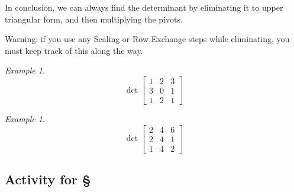 \documentclass[11pt,oneside]{amsbook}
\theoremstyle{definition}
\theoremstyle{plain}
\theoremstyle{definition}
\theoremstyle{remark}
\newtheorem{example}[theorem]{Example}
\numberwithin{equation}{section}
\numberwithin{figure}{section}
\begin{document}
In conclusion, we can always find the determinant by eliminating it to upper triangular form, and then multiplying the pivots.

Warning: if you use any Scaling or Row Exchange steps while eliminating, you must keep track of this along the way.

\begin{example}
  \[\det\begin{bmatrix}1&2&3\\3&0&1\\1&2&1\end{bmatrix}
  \]
\end{example}

\begin{example}
  \[\det\begin{bmatrix}2&4&6\\2&4&1\\1&4&2\end{bmatrix}
  \]
\end{example}
  
\newpage
\subsection*{Activity for \S \thesection}
\end{document}
